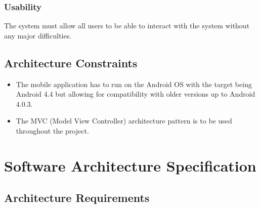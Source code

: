 \documentclass[12pt]{article}
\begin{document}
       						    \subsubsection{Usability}
			    	                  	The system must allow all users to be able to interact with the system without any major difficulties.
       						    	                  	
                
                		\subsection{Architecture Constraints}
                				
                				\begin{itemize}
                						\item The mobile application has to run on the Android OS with the target being Android 4.4 but allowing for compatibility with older versions up to Android 4.0.3. 
                						\item The MVC (Model View Controller) architecture pattern is to be used throughout the project.
                				\end{itemize}
               
                \section{Software Architecture Specification}
                
               		 \subsection{Architecture Requirements}
               		   
\end{document}

